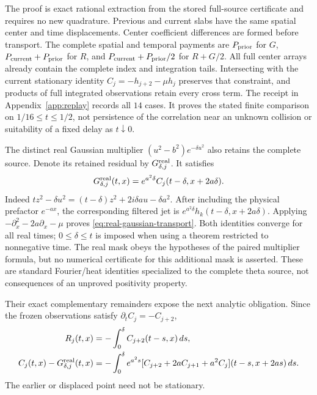 \documentclass[11pt]{article}
\numberwithin{equation}{section}
\theoremstyle{definition}
\theoremstyle{remark}
\newcommand{\dd}{\,d}
\begin{document}
The proof is exact rational extraction from the stored full-source
certificate and requires no new quadrature. Previous and current slabs
have the same spatial center and time displacements. Center coefficient
differences are formed before transport. The complete spatial and
temporal payments are $P_{\rm prior}$ for $G$,
$P_{\rm current}+P_{\rm prior}$ for $R$, and
$P_{\rm current}+P_{\rm prior}/2$ for $R+G/2$.
All full center arrays already contain the complete index and integration
tails. Intersecting with the current stationary identity
$C_j=-h_{j+2}-\mu h_j$ preserves that constraint, and products of full
integrated observations retain every cross term. The receipt in
Appendix~\ref{app:replay} records all $14$ cases. It proves the stated
finite comparison on $1/16\le t\le1/2$, not persistence of the
correlation near an unknown collision or suitability of a fixed delay
as $t\downarrow0$.

The distinct real Gaussian multiplier
$(u^2-b^2)e^{-\delta u^2}$ also retains the complete source. Denote
its retained residual by $G^{\rm real}_{\delta,j}$. It satisfies
\begin{equation}
 G^{\rm real}_{\delta,j}(t,x)
     =e^{a^2\delta}C_j(t-\delta,x+2a\delta).
 \label{eq:real-gaussian-transport}
\end{equation}
Indeed
$tz^2-\delta u^2=(t-\delta)z^2+2i\delta au-\delta a^2$.
After including the physical prefactor $e^{-ax}$, the corresponding
filtered jet is $e^{a^2\delta}h_k(t-\delta,x+2a\delta)$.
Applying $-\partial_x^2-2a\partial_x-\mu$ proves
\eqref{eq:real-gaussian-transport}.
Both identities converge for all real times; $0\le\delta\le t$
is imposed when using a theorem restricted to nonnegative time.
The real mask obeys the hypotheses of the paired multiplier formula,
but no numerical certificate for this additional mask is asserted.
These are standard Fourier/heat identities specialized to the complete
theta source, not consequences of an unproved positivity property.

Their exact complementary remainders expose the next analytic obligation.
Since the frozen observations satisfy $\partial_tC_j=-C_{j+2}$,
\begin{align}
 R_j(t,x)&=-\int_0^\delta C_{j+2}(t-s,x)\dd s,
       \label{eq:complex-gaussian-remainder}\\
 C_j(t,x)-G^{\rm real}_{\delta,j}(t,x)
   &=-\int_0^\delta e^{a^2s}
       [C_{j+2}+2aC_{j+1}+a^2C_j](t-s,x+2as)\dd s.
       \label{eq:real-gaussian-remainder}
\end{align}
The earlier or displaced point need not be stationary.
\end{document}
